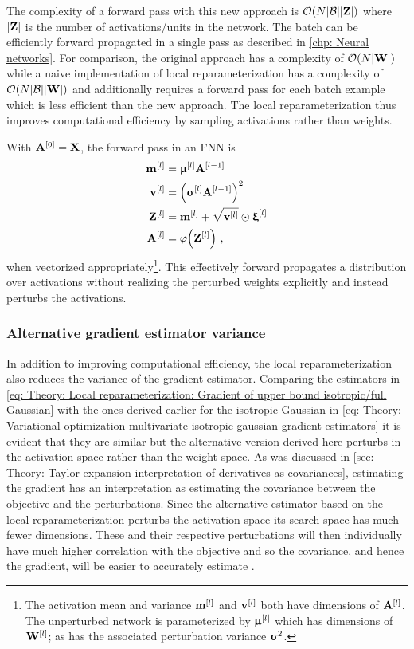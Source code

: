 The complexity of a forward pass with this new approach is $\mathcal{O}{\left(N{\left\lvert\mathcal{B}\right\rvert}{\left\lvert{\mathbf{Z}}\right\rvert}\right)}$ where ${\left\lvert{\mathbf{Z}}\right\rvert}$ is the number of activations/units in the network. The batch can be efficiently forward propagated in a single pass as described in \autoref{chp: Neural networks}. For comparison, the original approach has a complexity of $\mathcal{O}{\left(N{\left\lvert{\mathbf{W}}\right\rvert}\right)}$ while a naive implementation of local reparameterization has a complexity of $\mathcal{O}{\left(N{\left\lvert\mathcal{B}\right\rvert}{\left\lvert{\mathbf{W}}\right\rvert}\right)}$ and additionally requires a forward pass for each batch example which is less efficient than the new approach. The local reparameterization thus improves computational efficiency by sampling activations rather than weights.

With ${\mathbf{A}}^{\left[0\right]} = {\mathbf{X}}$, the forward pass in an \gls{FNN} is %
\begin{subequations}
    \begin{align}
        {\mathbf{m}}^{\left[l\right]} & = {\boldsymbol{\upmu}}^{\left[l\right]} {\mathbf{A}}^{\left[l-1\right]} \\
        {\mathbf{v}}^{\left[l\right]} & = \left( {\boldsymbol{\upsigma}}^{\left[l\right]} {\mathbf{A}}^{\left[l-1\right]}\right)^2 \\
        {\mathbf{Z}}^{\left[l\right]} & = {\mathbf{m}}^{\left[l\right]} + \sqrt{{\mathbf{v}}^{\left[l\right]}} \odot {\boldsymbol{\upxi}}^{\left[l\right]}\\
        {\mathbf{A}}^{\left[l\right]} &= \varphi{\left({\mathbf{Z}}^{\left[l\right]}\right)} \ ,
    \end{align}
\end{subequations}
when vectorized appropriately\footnote{The activation mean and variance ${\mathbf{m}}^{\left[l\right]}$ and ${\mathbf{v}}^{\left[l\right]}$ both have dimensions of ${\mathbf{A}}^{\left[l\right]}$. The unperturbed network is parameterized by ${\boldsymbol{\upmu}}^{\left[l\right]}$ which has dimensions of ${\mathbf{W}}^{\left[l\right]}$; as has the associated perturbation variance ${\boldsymbol{\upsigma}}^2$.}. This effectively forward propagates a distribution over activations without realizing the perturbed weights explicitly and instead perturbs the activations.


\subsubsection{Alternative gradient estimator variance}
In addition to improving computational efficiency, the local reparameterization also reduces the variance of the gradient estimator. Comparing the estimators in \eqref{eq: Theory: Local reparameterization: Gradient of upper bound isotropic/full Gaussian} with the ones derived earlier for the isotropic Gaussian in \eqref{eq: Theory: Variational optimization multivariate isotropic gaussian gradient estimators} it is evident that they are similar but the alternative version derived here perturbs in the activation space rather than the weight space. 
As was discussed in \autoref{sec: Theory: Taylor expansion interpretation of derivatives as covariances}, estimating the gradient has an interpretation as estimating the covariance between the objective and the perturbations. Since the alternative estimator based on the local reparameterization perturbs the activation space its search space has much fewer dimensions. These and their respective perturbations will then individually have much higher correlation with the objective and so the covariance, and hence the gradient, will be easier to accurately estimate \cite{Kingma2015a}.


